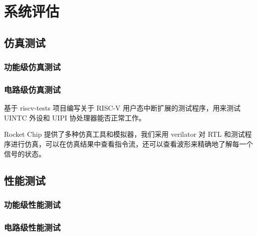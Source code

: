 
\chapter{系统评估}

\section{仿真测试}

\subsection{功能级仿真测试}

\subsection{电路级仿真测试}

基于 riscv-tests 项目\cite{riscvtests}编写关于 RISC-V 用户态中断扩展的测试程序，用来测试 UINTC 外设和 UIPI 协处理器能否正常工作。

Rocket Chip 提供了多种仿真工具和模拟器，我们采用 verilator 对 RTL 和测试程序进行仿真，可以在仿真结果中查看指令流，还可以查看波形来精确地了解每一个信号的状态。

\section{性能测试}

\subsection{功能级性能测试}

\subsection{电路级性能测试}
